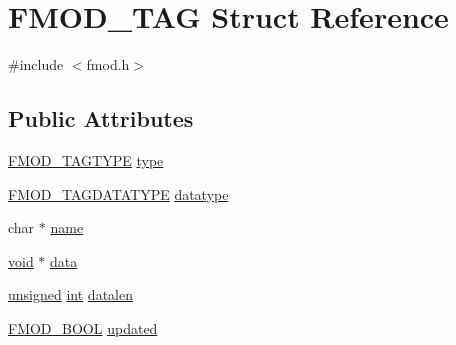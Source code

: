 \hypertarget{struct_f_m_o_d___t_a_g}{\section{F\-M\-O\-D\-\_\-\-T\-A\-G Struct Reference}
\label{struct_f_m_o_d___t_a_g}
}


{\ttfamily \#include $<$fmod.\-h$>$}

\subsection*{Public Attributes}
\begin{DoxyCompactItemize}
\item 
\hyperlink{fmod_8h_af46bedd1b67400835a0d4e438449b6f6}{F\-M\-O\-D\-\_\-\-T\-A\-G\-T\-Y\-P\-E} \hyperlink{struct_f_m_o_d___t_a_g_ad891c5f78e72ffeebc0f39e34e5b1b20}{type}
\item 
\hyperlink{fmod_8h_a915fac7fdf440761ccaa42f999149233}{F\-M\-O\-D\-\_\-\-T\-A\-G\-D\-A\-T\-A\-T\-Y\-P\-E} \hyperlink{struct_f_m_o_d___t_a_g_acc0f4bf92ee045d5828ba7eccc3c4c23}{datatype}
\item 
char $\ast$ \hyperlink{struct_f_m_o_d___t_a_g_a200d18627ec871638bb7df841a77b2ab}{name}
\item 
\hyperlink{wglew_8h_aeea6e3dfae3acf232096f57d2d57f084}{void} $\ast$ \hyperlink{struct_f_m_o_d___t_a_g_a86247271797eb33118a5fff813c1e548}{data}
\item 
\hyperlink{_free_image_8h_a425076c7067a1b5166e2cc530e914814}{unsigned} \hyperlink{wglew_8h_a500a82aecba06f4550f6849b8099ca21}{int} \hyperlink{struct_f_m_o_d___t_a_g_a589281f4f1adc717798744722ec43761}{datalen}
\item 
\hyperlink{fmod_8h_aa0c1e9c1b7e8c4ece6c33c6d64b20153}{F\-M\-O\-D\-\_\-\-B\-O\-O\-L} \hyperlink{struct_f_m_o_d___t_a_g_a0358f4afc9957d3d3254691c3118d90a}{updated}
\end{DoxyCompactItemize}


